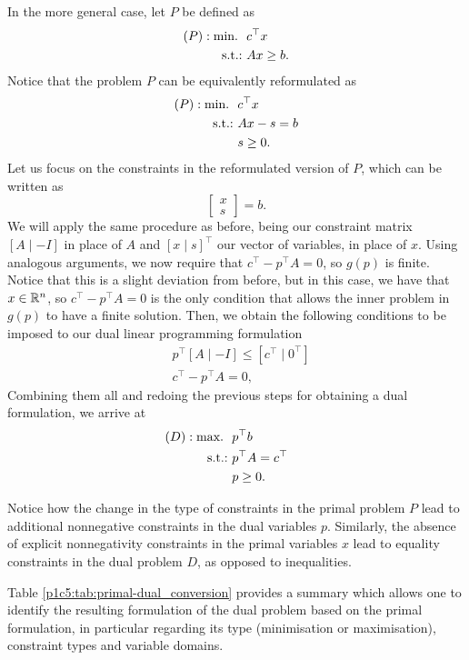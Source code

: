 In the more general case, let $P$ be defined as
%
\begin{align*}
	(P) : \mathop{\text{min.~}} \ & c^\top x \\
	\mathop{\text{s.t.:~}} 	  & Ax \geq b.  
\end{align*}
%
Notice that the problem $P$ can be equivalently reformulated as
%
\begin{align*}
	(P) : \mathop{\text{min.~}} \ & c^\top x \\
	\mathop{\text{s.t.:~}} & Ax - s = b \\
	& s \geq 0.
\end{align*}
%
Let us focus on the constraints in the reformulated version of $P$, which can be written as
%
\begin{equation*}
	[A \mid -I] \begin{bmatrix} x \\ s \end{bmatrix} = b. 
\end{equation*}
%
We will apply the same procedure as before, being our constraint matrix $[A \mid -I]$ in place of $A$ and $[x \mid s]^\top$ our vector of variables, in place of $x$. Using analogous arguments, we now require that $c^\top - p^\top A = 0$, so $g(p)$ is finite. Notice that this is a slight deviation from before, but in this case, we have that $x \in \mathbb{R}^n$, so $c^\top - p^\top A = 0$ is the only condition that allows the inner problem in $g(p)$ to have a finite solution. Then, we obtain the following conditions to be imposed to our dual linear programming formulation
%
\begin{align*}
	&p^\top [A \mid -I] \leq [c^\top \mid 0^\top]  \\
	&c^\top - p^\top A = 0, 
\end{align*}
%
Combining them all and redoing the previous steps for obtaining a dual formulation, we arrive at 
%
\begin{align*}
	(D) : \mathop{\text{max.~}} \ & p^\top b  \hspace{1.5cm}\\ 
	\mathop{\text{s.t.:~}} & p^\top A = c^\top \\
	& p \geq 0.
\end{align*}

Notice how the change in the type of constraints in the primal problem $P$ lead to additional nonnegative constraints in the dual variables $p$. Similarly, the absence of explicit nonnegativity constraints in the primal variables $x$ lead to equality constraints in the dual problem $D$, as opposed to inequalities. 

Table \ref{p1c5:tab:primal-dual_conversion} provides a summary which allows one to identify the resulting formulation of the dual problem based on the primal formulation, in particular regarding its type (minimisation or maximisation), constraint types and variable domains.

